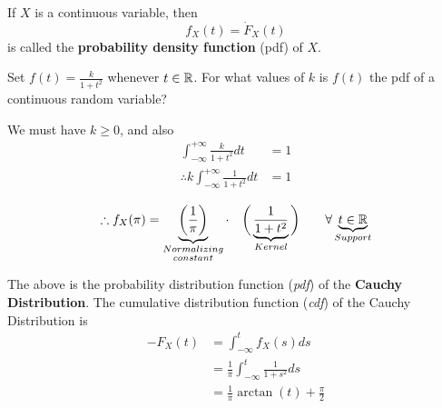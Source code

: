 \documentclass{article}
\begin{document}
	\begin{defn}
		If $X$ is a continuous variable, then
		$$ f_X (t) = \dot{F}_X (t)$$
		is called the \textbf{probability density function} (pdf) of $X$.
	\end{defn}
	\begin{exmp}
		Set $f(t) = \frac{k}{1+t^2}$ whenever $t \in \mathbb{R}$. For what values of $k$ is $f(t)$ the pdf of a continuous random variable?
		\begin{sol}
			We must have $k \geq 0$, and also
			\begin{align*}
				\int_{-\infty}^{+\infty} \frac{k}{1+t^2} dt &= 1\\
				\therefore k \int_{-\infty}^{+\infty} \frac{1}{1+t^2} dt &= 1 \\
			\end{align*}
				$$
				\therefore f_X (\pi) = \underbrace{ \bigg(  \frac{1}{\pi} \bigg) }_{\substack{Normalizing \\ constant}}  \cdot \quad \bigg( \underbrace{ \frac{1}{1+t^2}}_{Kernel} \bigg) \quad \quad \forall \underbrace{t \in \mathbb{R}}_{Support}
				$$
		\end{sol}
		The above is the probability distribution function (\emph{pdf}) of the \textbf{Cauchy Distribution}. The cumulative distribution function (\emph{cdf}) of the Cauchy Distribution is
		\begin{align*}
			- F_X (t) &= \int_{- \infty}^{t} f_X (s) ds \\
			&= \frac{1}{\pi} \int_{-\infty}^{t} \frac{1}{1+s^2} ds \\
			&= \frac{1}{\pi} \arctan (t) + \frac{\pi}{2}
		\end{align*}
	\end{exmp}
\end{document}
